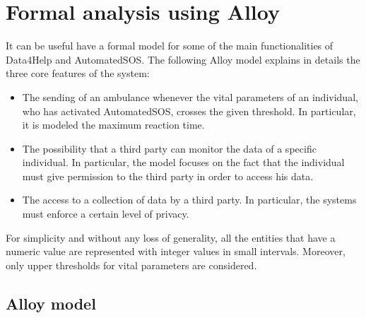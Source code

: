 \chapter{Formal analysis using Alloy}
It can be useful have a formal model for some of the main functionalities of Data4Help and AutomatedSOS. The following Alloy model explains in details the three core features of the system:

\begin{itemize}
\item The sending of an ambulance whenever the vital parameters of an individual, who has activated AutomatedSOS, crosses the given threshold. In particular, it is modeled the maximum reaction time.
\item The possibility that a third party can monitor the data of a specific individual. In particular, the model focuses on the fact that the individual must give permission to the third party in order to access his data.
\item The access to a collection of data by a third party. In particular, the systems must enforce a certain level of privacy.
\end{itemize}
For simplicity and without any loss of generality, all the entities that have a numeric value are represented with integer values in small intervals. Moreover, only upper thresholds for vital parameters are considered.

\section{Alloy model}



